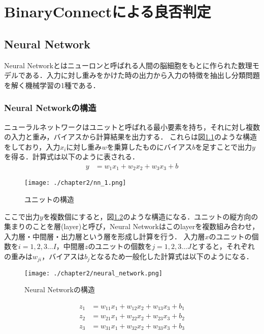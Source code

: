 

\chapter{BinaryConnectによる良否判定}

\section{Neural Network}
Neural Networkとはニューロンと呼ばれる人間の脳細胞をもとに作られた数理モデルである．入力に対し重みをかけた時の出力から入力の特徴を抽出し分類問題を解く機械学習の1種である．

\subsection{Neural Networkの構造}
ニューラルネットワークはユニットと呼ばれる最小要素を持ち，それに対し複数の入力と重み，バイアスから計算結果を出力する．
これらは図\ref{fig_NN1}のような構造をしており，入力$x_i$に対し重み$w$を乗算したものにバイアス$b$を足すことで出力$y$を得る．計算式は以下のように表される．
\begin{align*}
y &= w_{1}x_{1} + w_{2}x_{2} + w_{3}x_{3} + b
\end{align*}
\begin{figure}[]
  \begin{center}
    \texttt{[image: ./chapter2/nn\_1.png]}
    \caption{ユニットの構造}
    \label{fig_NN1}
  \end{center}
\end{figure}

ここで出力$y$を複数個にすると，図\ref{fig_NN}のような構造になる．ユニットの縦方向の集まりのことを層(layer)と呼び，Neural Networkはこのlayerを複数組み合わせ，入力層・中間層・出力層という層を形成し計算を行う．
入力層$x$のユニットの個数を$i=1,2,3\ldots I$，中間層$z$のユニットの個数を$j=1,2,3\ldots J$とすると，それぞれの重みは$w_{ji}$，バイアスは$b_j$となるため一般化した計算式は以下のようになる．
\begin{figure}[]
  \begin{center}
    \texttt{[image: ./chapter2/neural\_network.png]}
    \caption{Neural Networkの構造}
    \label{fig_NN}
  \end{center}
\end{figure}
\begin{align*}
z_{1} &= w_{11}x_{1} + w_{12}x_{2} + w_{13}x_{3} + b_1\\
z_{2} &= w_{21}x_{1} + w_{22}x_{2} + w_{23}x_{3} + b_2\\
z_{3} &= w_{31}x_{1} + w_{32}x_{2} + w_{33}x_{3} + b_3
\end{align*}

